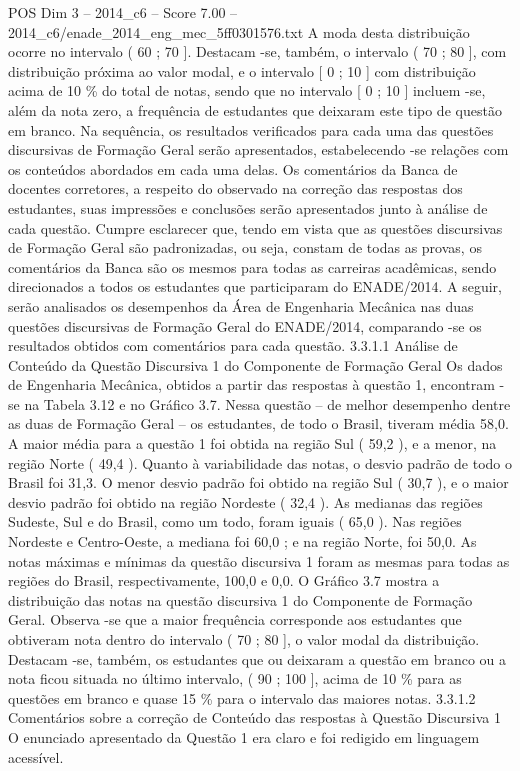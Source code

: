 \begin{textsample}{POS Dim 3 – 2014\_c6 – Score 7.00 – 2014\_c6/enade\_2014\_eng\_mec\_5ff0301576.txt}
A moda desta distribuição ocorre no intervalo ( 60 ; 70 ].
Destacam -se, também, o intervalo ( 70 ; 80 ], com distribuição próxima ao valor modal, e o intervalo [ 0 ; 10 ] com distribuição acima de 10 \% do total de notas, sendo que no intervalo [ 0 ; 10 ] incluem -se, além da nota zero, a frequência de estudantes que deixaram este tipo de questão em branco.
Na sequência, os resultados verificados para cada uma das questões discursivas de Formação Geral serão apresentados, estabelecendo -se relações com os conteúdos abordados em cada uma delas.
Os comentários da Banca de docentes corretores, a respeito do observado na correção das respostas dos estudantes, suas impressões e conclusões serão apresentados junto à análise de cada questão.
Cumpre esclarecer que, tendo em vista que as questões discursivas de Formação Geral são padronizadas, ou seja, constam de todas as provas, os comentários da Banca são os mesmos para todas as carreiras acadêmicas, sendo direcionados a todos os estudantes que participaram do ENADE/2014.
A seguir, serão analisados os desempenhos da Área de Engenharia Mecânica nas duas questões discursivas de Formação Geral do ENADE/2014, comparando -se os resultados obtidos com comentários para cada questão. 3.3.1.1 Análise de Conteúdo da Questão Discursiva 1 do Componente de Formação Geral Os dados de Engenharia Mecânica, obtidos a partir das respostas à questão 1, encontram -se na Tabela 3.12 e no Gráfico 3.7.
Nessa questão – de melhor desempenho dentre as duas de Formação Geral – os estudantes, de todo o Brasil, tiveram média 58,0.
A maior média para a questão 1 foi obtida na região Sul ( 59,2 ), e a menor, na região Norte ( 49,4 ).
Quanto à variabilidade das notas, o desvio padrão de todo o Brasil foi 31,3.
O menor desvio padrão foi obtido na região Sul ( 30,7 ), e o maior desvio padrão foi obtido na região Nordeste ( 32,4 ).
As medianas das regiões Sudeste, Sul e do Brasil, como um todo, foram iguais ( 65,0 ).
Nas regiões Nordeste e Centro-Oeste, a mediana foi 60,0 ; e na região Norte, foi 50,0.
As notas máximas e mínimas da questão discursiva 1 foram as mesmas para todas as regiões do Brasil, respectivamente, 100,0 e 0,0.
O Gráfico 3.7 mostra a distribuição das notas na questão discursiva 1 do Componente de Formação Geral.
Observa -se que a maior frequência corresponde aos estudantes que obtiveram nota dentro do intervalo ( 70 ; 80 ], o valor modal da distribuição.
Destacam -se, também, os estudantes que ou deixaram a questão em branco ou a nota ficou situada no último intervalo, ( 90 ; 100 ], acima de 10 \% para as questões em branco e quase 15 \% para o intervalo das maiores notas. 3.3.1.2 Comentários sobre a correção de Conteúdo das respostas à Questão Discursiva 1 O enunciado apresentado da Questão 1 era claro e foi redigido em linguagem acessível.

\end{textsample}
